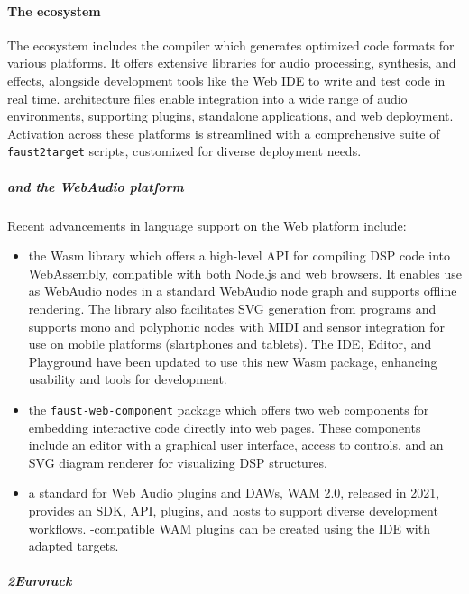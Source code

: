 \paragraph{The \F{} ecosystem}

The \F{} ecosystem includes the compiler which generates optimized code
formats for various platforms. It offers extensive libraries for audio
processing, synthesis, and effects, alongside development tools like the
\F{} Web IDE to write and test code in real time. \F{} architecture
files enable integration into a wide range of audio environments,
supporting plugins, standalone applications, and web deployment.
Activation across these platforms is streamlined with a comprehensive
suite of \texttt{faust2target} scripts, customized for diverse
deployment needs.

\subparagraph{\F{} and the WebAudio platform}

Recent advancements in \F{} language support on the Web platform
include:

\begin{itemize}
\item
  the \F{}Wasm library which offers a high-level API for compiling
  \F{} DSP code into WebAssembly, compatible with both Node.js and web
  browsers. It enables use as WebAudio nodes in a standard WebAudio node
  graph and supports offline rendering. The library also facilitates SVG
  generation from \F{} programs and supports mono and polyphonic nodes
  with MIDI and sensor integration for use on mobile platforms
  (slartphones and tablets). The \F{} IDE, Editor, and Playground have
  been updated to use this new \F{}Wasm package, enhancing usability
  and tools for \F{} development.
\item
  the \texttt{faust-web-component} package which offers two web
  components for embedding interactive \F{} code directly into web
  pages. These components include an editor with a graphical user
  interface, access to controls, and an SVG diagram renderer for
  visualizing DSP structures.
\item
  a standard for Web Audio plugins and DAWs, WAM 2.0, released in 2021,
  provides an SDK, API, plugins, and hosts to support diverse
  development workflows. \F{}-compatible WAM plugins can be created
  using the \F{} IDE with adapted targets.
\end{itemize}

\subparagraph{\F{}2Eurorack}

